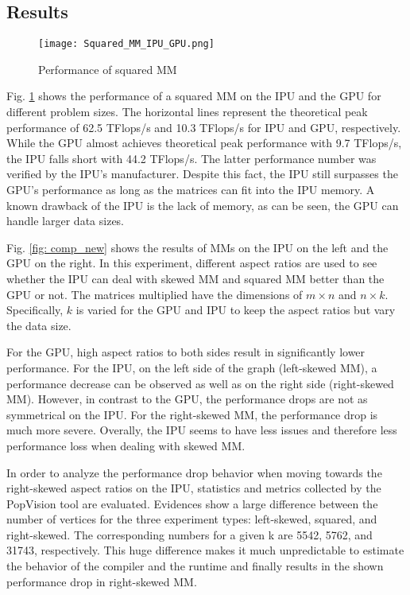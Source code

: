 \documentclass[a4paper,UKenglish,cleveref, autoref, thm-restate]{oasics-v2021}
\begin{document}
\subsection{Results}
\begin{figure}[htbp]
	\centerline{\texttt{[image: Squared\_MM\_IPU\_GPU.png]}}
	\caption{Performance of squared MM}
	\label{fig: GPU_perf_new}
\end{figure}

Fig. \ref{fig: GPU_perf_new} shows the performance of a squared MM on the IPU and the GPU for different problem sizes. The horizontal lines represent the theoretical peak performance of 62.5 TFlops/s and 10.3 TFlops/s for IPU and GPU, respectively. While the GPU almost achieves theoretical peak performance with 9.7 TFlops/s, the IPU falls short with 44.2 TFlops/s. The latter performance number was verified by the IPU's manufacturer. Despite this fact, the IPU still surpasses the GPU's performance as long as the matrices can fit into the IPU memory. A known drawback of the IPU is the lack of memory, as can be seen, the GPU can handle larger data sizes.

Fig. \ref{fig: comp_new} shows the results of MMs on the IPU on the left and the GPU on the right. In this experiment, different aspect ratios are used to see whether the IPU can deal with skewed MM and squared MM better than the GPU or not. The matrices multiplied have the dimensions of $m \times n$ and $n \times k$. Specifically, $k$ is varied for the GPU and IPU to keep the aspect ratios but vary the data size.

For the GPU, high aspect ratios to both sides result in significantly lower performance. For the IPU, on the left side of the graph (left-skewed MM), a performance decrease can be observed as well as on the right side (right-skewed MM). However,  in contrast to the GPU, the performance drops are not as symmetrical on the IPU. For the right-skewed MM, the performance drop is much more severe. 
Overally, the IPU seems to have less issues and therefore less performance loss when dealing with skewed MM.

In order to analyze the performance drop behavior when moving towards the right-skewed aspect ratios on the IPU, statistics and metrics collected by the PopVision tool are evaluated. Evidences show a large difference between the number of vertices for the three experiment types: left-skewed, squared, and right-skewed. The corresponding numbers for a given k are 5542, 5762, and 31743, respectively. This huge difference makes it much unpredictable to estimate the behavior of the compiler and the runtime and finally results in the shown performance drop in right-skewed MM.
\end{document}
